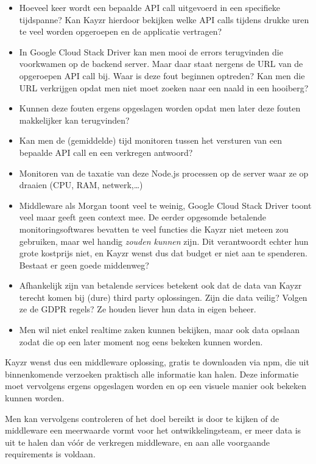 \begin{itemize}
	\item Hoeveel keer wordt een bepaalde API call uitgevoerd in een specifieke tijdspanne? Kan Kayzr hierdoor bekijken welke API calls tijdens drukke uren te veel worden opgeroepen en de applicatie vertragen?
	\item In Google Cloud Stack Driver kan men mooi de errors terugvinden die voorkwamen op de backend server. Maar daar staat nergens de URL van de opgeroepen API call bij. Waar is deze fout beginnen optreden? Kan men die URL verkrijgen opdat men niet moet zoeken naar een naald in een hooiberg?
	\item Kunnen deze fouten ergens opgeslagen worden opdat men later deze fouten makkelijker kan terugvinden?
	\item Kan men de (gemiddelde) tijd monitoren tussen het versturen van een bepaalde API call en een verkregen antwoord?
	\item Monitoren van de taxatie van deze Node.js processen op de server waar ze op draaien (CPU, RAM, netwerk,…)
	\item Middleware als Morgan toont veel te weinig, Google Cloud Stack Driver toont veel maar geeft geen context mee. De eerder opgesomde betalende monitoringsoftwares bevatten te veel functies die Kayzr niet meteen zou gebruiken, maar wel handig \textit{zouden kunnen} zijn. Dit verantwoordt echter hun grote kostprijs niet, en Kayzr wenst dus dat budget er niet aan te spenderen. Bestaat er geen goede middenweg?
	\item Afhankelijk zijn van betalende services betekent ook dat de data van Kayzr terecht komen bij (dure) third party oplossingen. Zijn die data veilig? Volgen ze de GDPR regels? Ze houden liever hun data in eigen beheer.
	\item Men wil niet enkel realtime zaken kunnen bekijken, maar ook data opslaan zodat die op een later moment nog eens bekeken kunnen worden.
\end{itemize}

Kayzr wenst dus een middleware oplossing, gratis te downloaden via npm, die uit binnenkomende verzoeken praktisch alle informatie kan halen. Deze informatie moet vervolgens ergens opgeslagen worden en op een visuele manier ook bekeken kunnen worden. 

Men kan vervolgens controleren of het doel bereikt is door te kijken of de middleware een meerwaarde vormt voor het ontwikkelingsteam, er meer data is uit te halen dan vóór de verkregen middleware, en aan alle voorgaande requirements is voldaan.



 






 
